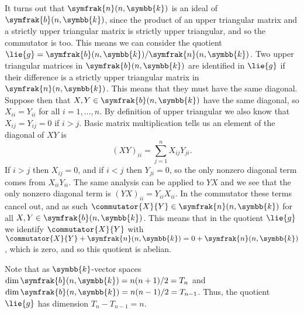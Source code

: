 \documentclass[fleqn]{NotesClass}
\renewcommand{\field}{\symbb{k}}
\newcommand{\borelLie}{\symfrak{b}}
\newcommand{\nilpotentLie}{\symfrak{n}}
\begin{document}
    It turns out that \(\nilpotentLie(n, \field)\) is an ideal of \(\borelLie(n, \field)\), since the product of an upper triangular matrix and a strictly upper triangular matrix is strictly upper triangular, and so the commutator is too.
    This means we can consider the quotient \(\lie{g} = \borelLie(n, \field)/\nilpotentLie(n, \field)\).
    Two upper triangular matrices in \(\borelLie(n, \field)\) are identified in \(\lie{g}\) if their difference is a strictly upper triangular matrix in \(\nilpotentLie(n, \field)\).
    This means that they must have the same diagonal.
    Suppose then that \(X, Y \in \borelLie(n, \field)\) have the same diagonal, so \(X_{ii} = Y_{ii}\) for all \(i = 1, \dotsc, n\).
    By definition of upper triangular we also know that \(X_{ij} = Y_{ij} = 0\) if \(i > j\).
    Basic matrix multiplication tells us an element of the diagonal of \(XY\) is
    \begin{equation}
        (XY)_{ii} = \sum_{j=1}^{n} X_{ij} Y_{ji}.
    \end{equation}
    If \(i > j\) then \(X_{ij} = 0\), and if \(i < j\) then \(Y_{ji} = 0\), so the only nonzero diagonal term comes from \(X_{ii} Y_{ii}\).
    The same analysis can be applied to \(YX\) and we see that the only nonzero diagonal term is \((YX)_{ii} = Y_{ii} X_{ii}\).
    In the commutator these terms cancel out, and as such \(\commutator{X}{Y} \in \nilpotentLie(n, \field)\) for all \(X, Y \in \borelLie(n, \field)\).
    This means that in the quotient \(\lie{g}\) we identify \(\commutator{X}{Y}\) with \(\commutator{X}{Y} + \nilpotentLie(n, \field) = 0 + \nilpotentLie(n, \field)\), which is zero, and so this quotient is abelian.
    
    Note that as \(\field\)-vector spaces \(\dim \borelLie(n, \field) = n(n + 1)/2 = T_n\) and \(\dim \borelLie(n, \field) = n(n - 1)/2 = T_{n-1}\).
    Thus, the quotient \(\lie{g}\) has dimension \(T_n - T_{n-1} = n\).
    
\end{document}
